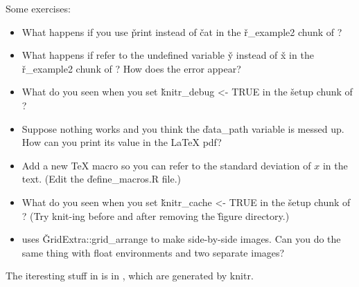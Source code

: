 Some exercises:

\begin{itemize}
    \item What happens if you use \v{print} instead of \v{cat}
        in the \v{r\_example2} chunk of ?

    \item What happens if refer to the undefined variable \v{y} instead of \v{x}
        in the \v{r\_example2} chunk of ?  How
        does the error appear?

    \item What do you seen when you set \v{knitr\_debug <- TRUE} in the
        \v{setup} chunk of ?

    \item Suppose nothing works and you think the \v{data\_path} variable
        is messed up.  How can you print its value in the LaTeX pdf?

    \item Add a new TeX macro so you can refer to the standard deviation of $x$
        in the text.  (Edit the \v{define_macros.R} file.)

    \item What do you seen when you set \v{knitr\_cache <- TRUE} in the
        \v{setup} chunk of ?  (Try knit-ing before
        and after removing the \v{figure} directory.)

    \item  {} uses \v{GridExtra::grid\_arrange} to make
        side-by-side images.  Can you do the same thing with float environments
        and two separate images?

\end{itemize}

The iteresting stuff in is in , which
are generated by knitr.
